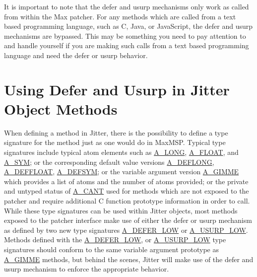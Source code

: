 It is important to note that the defer and usurp mechanisms only work as called from within the Max patcher. For any methods which are called from a text based programming language, such as C, Java, or JavaScript, the defer and usurp mechanisms are bypassed. This may be something you need to pay attention to and handle yourself if you are making such calls from a text based programming language and need the defer or usurp behavior.\hypertarget{chapter_jit_sched_chapter_jit_sched_using}{}\section{Using Defer and Usurp in Jitter Object Methods}\label{chapter_jit_sched_chapter_jit_sched_using}
When defining a method in Jitter, there is the possibility to define a type signature for the method just as one would do in MaxMSP. Typical type signatures include typical atom elements such as \hyperlink{group__atom_gga8aa6700e9f00b132eb376db6e39ade47a002f28879581a6f66ea492b994b96f1e}{A\_\-LONG}, \hyperlink{group__atom_gga8aa6700e9f00b132eb376db6e39ade47a0b3aa0ab8104573dfc9cb70b5b08031f}{A\_\-FLOAT}, and \hyperlink{group__atom_gga8aa6700e9f00b132eb376db6e39ade47a2d661c2a5d949566e2f1944c99bceeea}{A\_\-SYM}; or the corresponding default value versions \hyperlink{group__atom_gga8aa6700e9f00b132eb376db6e39ade47a7bd979db3dcf86909e24a1d1452e2205}{A\_\-DEFLONG}, \hyperlink{group__atom_gga8aa6700e9f00b132eb376db6e39ade47a42b644240dcbb90fe67282a4d0688776}{A\_\-DEFFLOAT}, \hyperlink{group__atom_gga8aa6700e9f00b132eb376db6e39ade47aa010616276cb89bcd04bcba611e18d51}{A\_\-DEFSYM}; or the variable argument version \hyperlink{group__atom_gga8aa6700e9f00b132eb376db6e39ade47a81c1a8550f038db16a619167a70a79b6}{A\_\-GIMME} which provides a list of atoms and the number of atoms provided; or the private and untyped status of \hyperlink{group__atom_gga8aa6700e9f00b132eb376db6e39ade47af48193ec36e53b1507d81c49873c8d7a}{A\_\-CANT} used for methods which are not exposed to the patcher and require additional C function prototype information in order to call. While these type signatures can be used within Jitter objects, most methods exposed to the patcher interface make use of either the defer or usurp mechanism as defined by two new type signatures \hyperlink{group__atom_gga8aa6700e9f00b132eb376db6e39ade47a4556bc5fe0d4f8cc55eda5aeeee55cf2}{A\_\-DEFER\_\-LOW} or \hyperlink{group__atom_gga8aa6700e9f00b132eb376db6e39ade47a8c844b0a1b551341a6a5e3b95d2f1152}{A\_\-USURP\_\-LOW}. Methods defined with the \hyperlink{group__atom_gga8aa6700e9f00b132eb376db6e39ade47a4556bc5fe0d4f8cc55eda5aeeee55cf2}{A\_\-DEFER\_\-LOW}, or \hyperlink{group__atom_gga8aa6700e9f00b132eb376db6e39ade47a8c844b0a1b551341a6a5e3b95d2f1152}{A\_\-USURP\_\-LOW} type signatures should conform to the same variable argument prototype as \hyperlink{group__atom_gga8aa6700e9f00b132eb376db6e39ade47a81c1a8550f038db16a619167a70a79b6}{A\_\-GIMME} methods, but behind the scenes, Jitter will make use of the defer and usurp mechanism to enforce the appropriate behavior.

